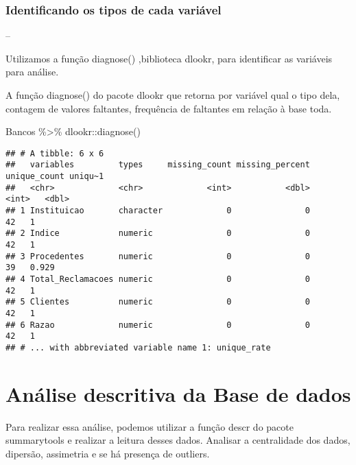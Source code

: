\documentclass[
]{article}
\newenvironment{Shaded}{\begin{snugshade}}{\end{snugshade}}
\newcommand{\FunctionTok}[1]{\textcolor[rgb]{0.00,0.00,0.00}{#1}}
\newcommand{\NormalTok}[1]{#1}
\newcommand{\SpecialCharTok}[1]{\textcolor[rgb]{0.00,0.00,0.00}{#1}}
\begin{document}
\hypertarget{identificando-os-tipos-de-cada-variuxe1vel}{%
\subsubsection{Identificando os tipos de cada
variável}\label{identificando-os-tipos-de-cada-variuxe1vel}}

--

Utilizamos a função diagnose() ,biblioteca dlookr, para identificar as
variáveis para análise.

A função diagnose() do pacote dlookr que retorna por variável qual o
tipo dela, contagem de valores faltantes, frequência de faltantes em
relação à base toda.

\begin{Shaded}
\begin{Highlighting}[]
\NormalTok{Bancos }\SpecialCharTok{\%\textgreater{}\%}\NormalTok{ dlookr}\SpecialCharTok{::}\FunctionTok{diagnose}\NormalTok{()}
\end{Highlighting}
\end{Shaded}

\begin{verbatim}
## # A tibble: 6 x 6
##   variables         types     missing_count missing_percent unique_count uniqu~1
##   <chr>             <chr>             <int>           <dbl>        <int>   <dbl>
## 1 Instituicao       character             0               0           42   1    
## 2 Indice            numeric               0               0           42   1    
## 3 Procedentes       numeric               0               0           39   0.929
## 4 Total_Reclamacoes numeric               0               0           42   1    
## 5 Clientes          numeric               0               0           42   1    
## 6 Razao             numeric               0               0           42   1    
## # ... with abbreviated variable name 1: unique_rate
\end{verbatim}

\hypertarget{anuxe1lise-descritiva-da-base-de-dados}{%
\section{Análise descritiva da Base de
dados}\label{anuxe1lise-descritiva-da-base-de-dados}}

Para realizar essa análise, podemos utilizar a função descr do pacote
summarytools e realizar a leitura desses dados. Analisar a centralidade
dos dados, dipersão, assimetria e se há presença de outliers.
\end{document}
